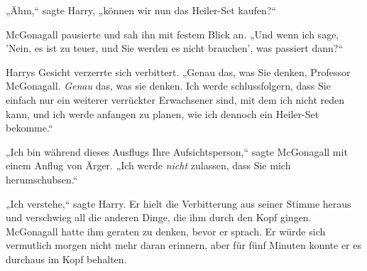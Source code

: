 „Ähm,“ sagte Harry, „können wir nun das Heiler-Set kaufen?“

McGonagall pausierte und sah ihn mit festem Blick an. „Und wenn ich sage, 'Nein, es ist zu teuer, und Sie werden es nicht brauchen', was passiert dann?“

Harrys Gesicht verzerrte sich verbittert. „Genau das, was Sie denken, Professor McGonagall. \emph{Genau} das, was sie denken. Ich werde schlussfolgern, dass Sie einfach nur ein weiterer verrückter Erwachsener sind, mit dem ich nicht reden kann, und ich werde anfangen zu planen, wie ich dennoch ein Heiler-Set bekomme.“

„Ich bin während dieses Ausflugs Ihre Aufsichtsperson,“ sagte McGonagall mit einem Anflug von Ärger. „Ich werde \emph{nicht} zulassen, dass Sie mich herumschubsen.“

„Ich verstehe,“ sagte Harry. Er hielt die Verbitterung aus seiner Stimme heraus und verschwieg all die anderen Dinge, die ihm durch den Kopf gingen. McGonagall hatte ihm geraten zu denken, bevor er sprach. Er würde sich vermutlich morgen nicht mehr daran erinnern, aber für fünf Minuten konnte er es durchaus im Kopf behalten.

